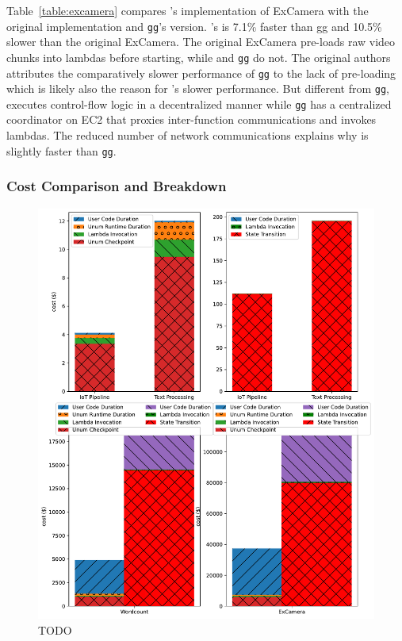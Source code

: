 
Table~\ref{table:excamera} compares \name{}'s implementation of ExCamera with
the original implementation and \texttt{gg}'s version. \name{}'s is 7.1\%
faster than gg and 10.5\% slower than the original ExCamera. The original
ExCamera pre-loads raw video chunks into lambdas before starting, while
\name{} and \texttt{gg} do not. The original authors attributes the
comparatively slower performance of \texttt{gg} to the lack of pre-loading
which is likely also the reason for \name{}'s slower performance. But
different from \texttt{gg}, \name{} executes control-flow logic in a
decentralized manner while \texttt{gg} has a centralized coordinator on EC2
that proxies inter-function communications and invokes lambdas. The reduced
number of network communications  explains why \name{} is slightly
faster than \texttt{gg}.


\subsubsection{Cost Comparison and Breakdown}

\begin{figure}[t!]
    \centering
    \includegraphics[width=\columnwidth]{figures/AppCostBreakdown.pdf}
    \caption{TODO}
    \label{fig:cost-breakdown}
\end{figure}

